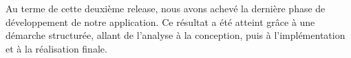 \begin{justify}
    Au terme de cette deuxième release, nous avons achevé la dernière phase de développement de notre application. Ce résultat a été atteint grâce à une démarche structurée, allant de l’analyse à la conception, puis à l’implémentation et à la réalisation finale.
\end{justify}
